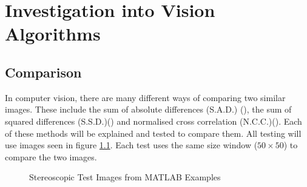 \chapter{Investigation into Vision Algorithms} \label{Chapter:InvestigationVision}

\section{Comparison}
In computer vision, there are many different ways of comparing two similar images. These include the sum of absolute differences (S.A.D.) (\cite{Hamzah:DistanceDetection}), the sum of squared differences (S.S.D.)(\cite{Mrovlje:Distance_Stereoscopic}) and  normalised cross correlation (N.C.C.)(\cite{zhao2006image}). Each of these methods will be explained and tested to compare them. All testing will use images seen in figure \ref{fig:StereoTest}. Each test uses the same size window ($50\times50$) to compare the two images. 

\begin{figure}
\centering
{}
\caption{Stereoscopic Test Images from MATLAB Examples}
\label{fig:StereoTest}
\end{figure}


